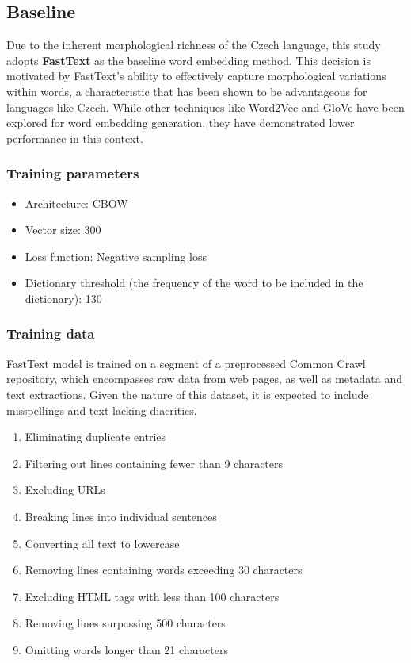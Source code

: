 \subsection{Baseline}
Due to the inherent morphological richness of the Czech language, this study adopts \textbf{FastText} as the baseline word embedding method.
This decision is motivated by FastText's ability to effectively capture morphological variations within words, a characteristic that has been shown to be advantageous for languages like Czech.
While other techniques like Word2Vec and \ac{GloVe} have been explored for word embedding generation, they have demonstrated lower performance in this context.

\subsubsection{Training parameters}
\begin{itemize}
  \item Architecture: \ac{CBOW}
  \item Vector size: 300
  \item Loss function: Negative sampling loss
  \item Dictionary threshold (the frequency of the word to be included in the dictionary): 130
\end{itemize}

\subsubsection{Training data}

FastText model is trained on a segment of a preprocessed Common Crawl repository, which encompasses raw data from web pages, as well as metadata and text extractions.
Given the nature of this dataset, it is expected to include misspellings and text lacking diacritics.

\begin{enumerate}
  \item Eliminating duplicate entries
  \item Filtering out lines containing fewer than 9 characters
  \item Excluding URLs
  \item Breaking lines into individual sentences
  \item Converting all text to lowercase
  \item Removing lines containing words exceeding 30 characters
  \item Excluding HTML tags with less than 100 characters
  \item Removing lines surpassing 500 characters
  \item Omitting words longer than 21 characters

\end{enumerate}


